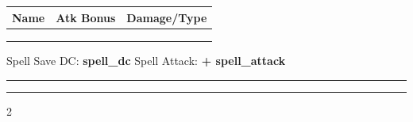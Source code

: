 \documentclass[10pt]{article}
\begin{document}
\begin{minipage}[t]{0.70\textwidth}
\begin{tcolorbox}[title=Attacks \& Spellcasting]
\begin{tabularx}{\linewidth}{|>{\raggedright\arraybackslash}X|c|c|}
\hline
\textbf{Name} & \textbf{Atk Bonus} & \textbf{Damage/Type} \\
\hline
\rule{0pt}{12pt} & & \\
\hline
\rule{0pt}{12pt} & & \\
\hline
\rule{0pt}{12pt} & & \\
\hline
\end{tabularx}
\vspace{4pt}
Spell Save DC: \textbf{{ spell_dc }} \hfill Spell Attack: \textbf{+{{ spell_attack }}}
\end{tcolorbox}

\begin{tcolorbox}[title=Features \& Traits]
\rule{\linewidth}{1.45in}
\end{tcolorbox}

\begin{tcolorbox}[title=Equipment]
\rule{\linewidth}{1.0in}
\end{tcolorbox}

\begin{tcolorbox}[title=Spells Prepared / Known]
\begin{multicols}{2}
\end{multicols}
\end{tcolorbox}

\end{minipage}
\end{document}
